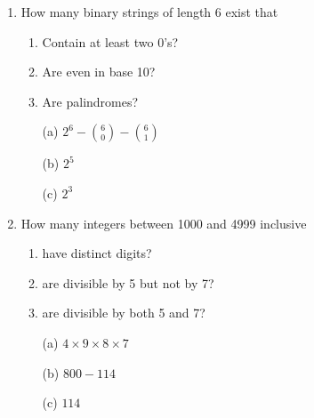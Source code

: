 \begin{enumerate}

















    

\item How many binary strings of length 6 exist that 
\begin{enumerate}
    \item Contain at least two 0's?
    \item Are even in base 10?
    \item Are palindromes?
\end{enumerate}

\begin{solution}
\begin{enumerate}
    \item[(a)] $2^6 - {6 \choose 0} - {6 \choose 1}$
    \item[(b)] $2^5$
    \item[(c)] $2^3$
\end{enumerate}
\end{solution}

\item How many integers between 1000 and 4999 inclusive 
\begin{enumerate}
    \item have distinct digits?
    \item are divisible by 5 but not by 7?
    \item are divisible by both 5 and 7?
\end{enumerate}

\begin{solution}
\begin{enumerate}
    \item[(a)] $4 \times 9 \times 8 \times 7$
    \item[(b)] $800-114$
    \item[(c)] $114$
\end{enumerate}
\end{solution}



\end{enumerate}
